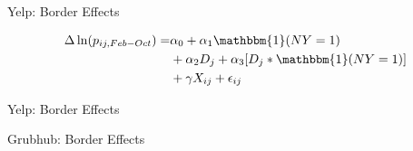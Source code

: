 \documentclass[xcolor=table]{beamer}
\newcommand\Wider[2][4em]{%
\makebox[\linewidth][c]{%
  \begin{minipage}{\dimexpr\textwidth+#1\relax}
  \raggedright#2
  \end{minipage}%
  }%
}
\begin{document}
\begin{spacing}{1.2}
\begin{frame}{Yelp: Border Effects}
\Wider{
\centering
\tiny

}

\small
$$
\begin{aligned}
\Delta \ln (p_{ij,Feb-Oct})  = & \alpha_0 + \alpha_1  \mathbbm{1}(NY=1)  \\
& + \alpha_2 D_{j} + \alpha_3[D_j * \mathbbm{1}(NY=1)]  \\
& +\gamma X_{ij}  + \epsilon_{ij} 
\end{aligned}
$$
\end{frame}

\begin{frame}{Yelp: Border Effects}
\tiny

\end{frame}


\begin{frame}{Grubhub: Border Effects}
\tiny

\end{frame}

\end{spacing}
\end{document}
